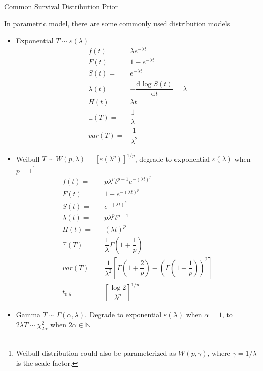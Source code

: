 \begin{point}
    Common Survival Distribution Prior
\end{point}

In parametric model, there are some commonly used distribution models
\begin{itemize}[topsep=2pt,itemsep=0pt]
    \item Exponential $ T\sim \varepsilon (\lambda ) $
    \begin{align}
        f(t)=&\lambda e^{-\lambda t}\\
    F(t)=&1- e^{-\lambda t}\\
    S(t)=&e^{-\lambda t}\\
    \lambda (t)=&-\dfrac{\mathrm{d}^{} \log S(t)}{\mathrm{d}^{}t}=\lambda \\
    H(t)=&\lambda t\\
    \mathbb{E}(T)=&\dfrac{1}{\lambda }\\
    var(T)=&\dfrac{1}{\lambda ^2}
    \end{align}
    \item Weibull $T\sim W(p,\lambda )=\left[\varepsilon (\lambda ^p)\right]^{1/p}$, degrade to exponential $ \varepsilon (\lambda ) $ when $ p=1 $\footnote{Weibull distribution could also be parameterized as $ W(p,\gamma ) $, where $ \gamma =1/\lambda  $ is the scale factor.}
    \begin{align}
        f(t)=&p\lambda ^pt^{p-1}e^{-(\lambda t)^p}\\
        F(t)=&1-e^{-(\lambda t)^p}\\
        S(t)=&e^{-(\lambda t)^p}\\
        \lambda (t)=&p\lambda ^pt^{p-1}\\
        H(t)=&(\lambda t)^p\\
        \mathbb{E}(T)=&\dfrac{1}{\lambda }\Gamma(1+\dfrac{1}{p})\\
        var(T)=&\dfrac{1}{\lambda ^2}\left[ \Gamma (1+\dfrac{2}{p})-(\Gamma (1+\dfrac{1}{p}))^2 \right]\\
        t_{0.5}=&\left[ \dfrac{\log 2}{\lambda ^p} \right]^{1/p}
    \end{align}
    \item Gamma $T\sim \Gamma (\alpha ,\lambda )$. Degrade to exponential $ \varepsilon (\lambda ) $ when $ \alpha =1 $, to $ 2\lambda T\sim \chi^2_{2\alpha }  $ when $ 2\alpha \in\mathbb{N} $
    \begin{align}

\end{align}
\end{itemize}

